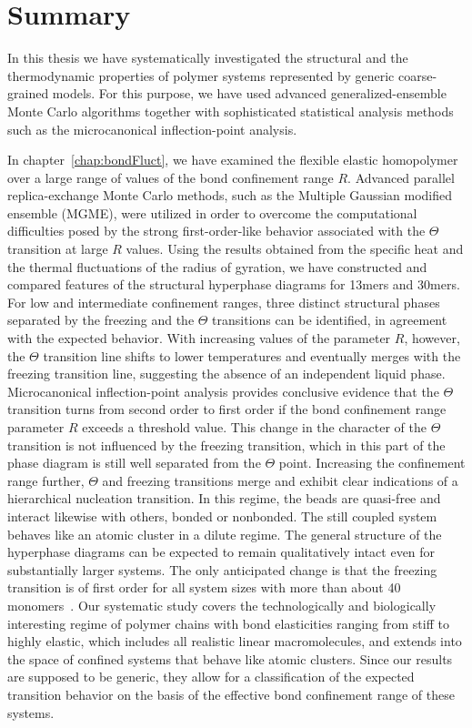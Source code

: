 \documentclass[12pt]{report}
\begin{document}
\chapter{Summary}

%
In this thesis we have systematically investigated the structural and the thermodynamic properties of polymer systems represented by generic coarse-grained models. For this purpose, we have used advanced generalized-ensemble Monte Carlo algorithms together with sophisticated statistical analysis methods such as the microcanonical inflection-point analysis.
%

%
In chapter~\ref{chap:bondFluct}, we have examined the flexible elastic homopolymer over a large range of values of the bond confinement range $R$. Advanced parallel replica-exchange Monte Carlo methods, such as the Multiple Gaussian modified ensemble (MGME), were utilized in order to overcome the computational difficulties posed by the strong first-order-like behavior associated with the $\Theta$ transition at large $R$ values. Using the results obtained from the specific heat and the thermal fluctuations of the radius of gyration, we have constructed and compared features of the structural hyperphase diagrams for 13mers and 30mers. For low and intermediate confinement ranges, three distinct structural phases separated by the freezing and the $\Theta$ transitions can be identified, in agreement with the expected behavior. With increasing values of the parameter $R$, however, the $\Theta$ transition line shifts to lower temperatures and eventually merges with the freezing transition line, suggesting the absence of an independent liquid phase. Microcanonical inflection-point analysis provides conclusive evidence that the $\Theta$ transition turns from second order to first order if the bond confinement range parameter $R$ exceeds a threshold value. This change in the character of the $\Theta$ transition is not influenced by the freezing transition, which in this part of the phase diagram is still well separated from the $\Theta$ point. Increasing the confinement range further, $\Theta$ and freezing transitions merge and exhibit clear indications of a hierarchical nucleation transition. In this regime, the beads  are quasi-free and interact likewise with others, bonded or nonbonded. The still coupled system behaves like an atomic cluster in a dilute regime. The general structure of the hyperphase diagrams can be expected to remain qualitatively intact even for substantially larger systems. The only anticipated change is that the freezing transition is of first order for all system sizes with more than about 40 monomers~\cite{Schnabel2011}. Our systematic study covers the technologically and biologically interesting regime of polymer chains with bond elasticities ranging from stiff to highly elastic, which includes all realistic linear macromolecules,  and extends into the space of confined systems that behave like atomic clusters. Since our results are supposed to be generic, they allow for a classification of the expected transition behavior on the basis of the effective bond confinement range of these systems.
%
\end{document}
